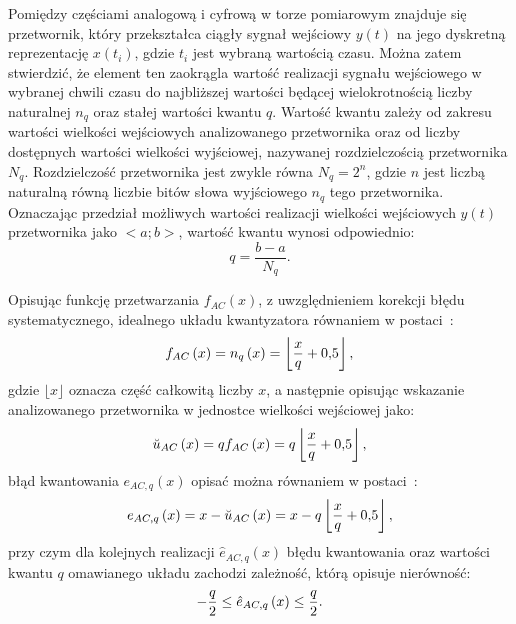 Pomiędzy częściami analogową i cyfrową w torze pomiarowym znajduje się przetwornik, który przekształca ciągły sygnał wejściowy $y(t)$ na jego dyskretną reprezentację $x(t_{i})$, gdzie $t_{i}$ jest wybraną wartością czasu. Można zatem stwierdzić, że element ten zaokrągla wartość realizacji sygnału wejściowego w wybranej chwili czasu do najbliższej wartości będącej wielokrotnością liczby naturalnej $n_{q}$ oraz stałej wartości kwantu $q$. Wartość kwantu zależy od zakresu wartości wielkości wejściowych analizowanego przetwornika oraz od liczby dostępnych wartości wielkości wyjściowej, nazywanej rozdzielczością przetwornika $N_{q}$. Rozdzielczość przetwornika jest zwykle równa $N_{q} = 2^{n}$, gdzie $n$ jest liczbą naturalną równą liczbie bitów słowa wyjściowego $n_{q}$ tego przetwornika. Oznaczając przedział możliwych wartości realizacji wielkości wejściowych $y(t)$ przetwornika jako $<a;b>$, wartość kwantu wynosi odpowiednio:
\begin{equation}
q = \frac{b - a}{N_{q}} \label{eq:adc_quant}.
\end{equation}

Opisując funkcję przetwarzania $f_{AC}(x)$, z uwzględnieniem korekcji błędu systematycznego, idealnego układu kwantyzatora równaniem w postaci~\cite{jakubiec_przetwarzanie}:
\begin{equation}
f_{AC} \left(x\right) = n_{q} \left(x\right) = \left\lfloor \frac{x}{q} + \num{0.5} \right\rfloor \label{eq:adc_function},
\end{equation}
gdzie $\lfloor x \rfloor$ oznacza część całkowitą liczby $x$, a następnie opisując wskazanie analizowanego przetwornika w jednostce wielkości wejściowej jako:
\begin{equation}
\breve{u}_{AC} \left(x\right) = q f_{AC} \left(x\right) = q \left\lfloor \frac{x}{q} + \num{0.5} \right\rfloor \label{eq:adc_output},
\end{equation}
błąd kwantowania $e_{AC,q}(x)$ opisać można równaniem w postaci~\cite{jakubiec_przetwarzanie}:
\begin{equation}
e_{AC,q} \left(x\right) = x - \breve{u}_{AC} \left(x\right) = x - q \left\lfloor \frac{x}{q} + \num{0.5} \right\rfloor \label{eq:adc_qerror},
\end{equation}
przy czym dla kolejnych realizacji $\hat{e}_{AC,q}(x)$ błędu kwantowania oraz wartości kwantu $q$ omawianego układu zachodzi zależność, którą opisuje nierówność:
\begin{equation}
-\frac{q}{2} \le \hat{e}_{AC,q} \left(x\right) \le \frac{q}{2} \label{eq:adc_qerrrange}.
\end{equation}

